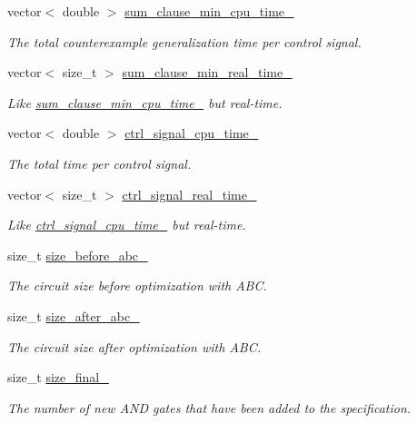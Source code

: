 \begin{DoxyCompactItemize}
vector$<$ double $>$ \hyperlink{classLearningExtractorStatistics_a61118ceb2f3bd2072ce584971fb37ae2}{sum\-\_\-clause\-\_\-min\-\_\-cpu\-\_\-time\-\_\-}
\begin{DoxyCompactList}\small\item\em The total counterexample generalization time per control signal. \end{DoxyCompactList}\item 
vector$<$ size\-\_\-t $>$ \hyperlink{classLearningExtractorStatistics_a552f8b12efb9b8460efd32d805e66eac}{sum\-\_\-clause\-\_\-min\-\_\-real\-\_\-time\-\_\-}
\begin{DoxyCompactList}\small\item\em Like \hyperlink{classLearningExtractorStatistics_a61118ceb2f3bd2072ce584971fb37ae2}{sum\-\_\-clause\-\_\-min\-\_\-cpu\-\_\-time\-\_\-} but real-\/time. \end{DoxyCompactList}\item 
vector$<$ double $>$ \hyperlink{classLearningExtractorStatistics_a836a3f1d0bdf023577056a8b05f769ca}{ctrl\-\_\-signal\-\_\-cpu\-\_\-time\-\_\-}
\begin{DoxyCompactList}\small\item\em The total time per control signal. \end{DoxyCompactList}\item 
vector$<$ size\-\_\-t $>$ \hyperlink{classLearningExtractorStatistics_ae75aebbe85e3b916e922b9472cb5474f}{ctrl\-\_\-signal\-\_\-real\-\_\-time\-\_\-}
\begin{DoxyCompactList}\small\item\em Like \hyperlink{classLearningExtractorStatistics_a836a3f1d0bdf023577056a8b05f769ca}{ctrl\-\_\-signal\-\_\-cpu\-\_\-time\-\_\-} but real-\/time. \end{DoxyCompactList}\item 
size\-\_\-t \hyperlink{classLearningExtractorStatistics_ae1dfe12c84dc72fd7b8f664ebe069103}{size\-\_\-before\-\_\-abc\-\_\-}
\begin{DoxyCompactList}\small\item\em The circuit size before optimization with A\-B\-C. \end{DoxyCompactList}\item 
size\-\_\-t \hyperlink{classLearningExtractorStatistics_a6684883b2634d0ea619aaf145eb86b8d}{size\-\_\-after\-\_\-abc\-\_\-}
\begin{DoxyCompactList}\small\item\em The circuit size after optimization with A\-B\-C. \end{DoxyCompactList}\item 
size\-\_\-t \hyperlink{classLearningExtractorStatistics_a4b09852748af7edc14a8a884dac6efce}{size\-\_\-final\-\_\-}
\begin{DoxyCompactList}\small\item\em The number of new A\-N\-D gates that have been added to the specification. \end{DoxyCompactList}\end{DoxyCompactItemize}
